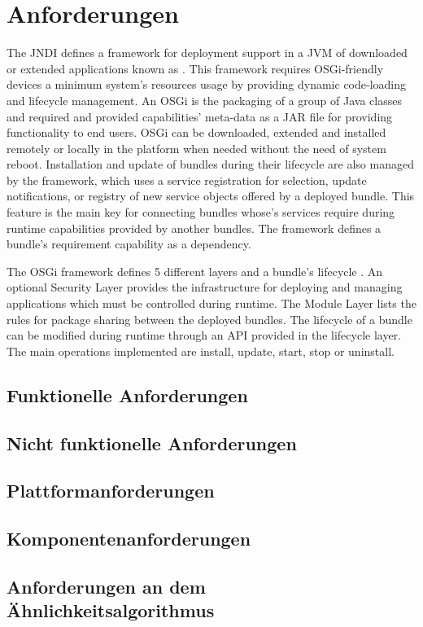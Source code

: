 \section{Anforderungen}
\label{sec:AnforderungenBD4B}

The \ac{JNDI} defines a framework for deployment support in a \ac{JVM} of downloaded or extended applications known as . This framework requires OSGi-friendly devices a minimum system's resources usage by providing dynamic code-loading and  lifecycle management. An \ac{OSGi}  is the packaging of a group of Java classes and required and provided capabilities' meta-data as a JAR file for providing functionality to end users. \ac{OSGi}  can be downloaded, extended and installed remotely or locally in the platform when needed without the need of system reboot. Installation and update of bundles during their lifecycle are also managed by the framework, which uses a service registration for selection, update notifications, or registry of new service objects offered by a deployed bundle. This feature is the main key for connecting bundles whose's services require during runtime capabilities provided by another bundles. The framework defines a bundle's requirement capability as a dependency.      

The \ac{OSGi} framework defines 5 different layers and a bundle's lifecycle \cite{OSGi2011}. An optional Security Layer provides the infrastructure for deploying and managing applications which must be controlled during runtime. The Module Layer lists the rules for package sharing between the deployed bundles. The lifecycle of a bundle can be modified during runtime through an API provided in the lifecycle layer. The main operations implemented are install, update, start, stop or uninstall. 

\subsection{Funktionelle Anforderungen}
\subsection{Nicht funktionelle Anforderungen}
\subsection{Plattformanforderungen}
\subsection{Komponentenanforderungen}
\subsection{Anforderungen an dem Ähnlichkeitsalgorithmus}
